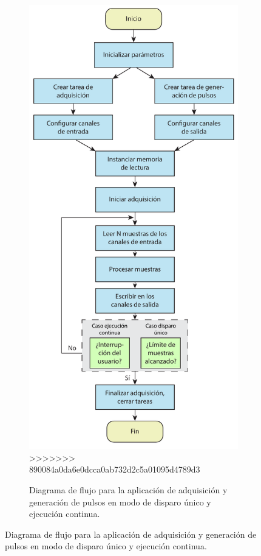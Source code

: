 \documentclass[a4paper,11pt]{article}
\begin{document}
\begin{figure}[!ht]
\begin{figure}[h!]
        \centering
        \includegraphics[height=.95\textheight]{figs/flujo_software.pdf}
>>>>>>> 890084a0da6e0dcca0ab732d2c5a01095d4789d3
        \caption{Diagrama de flujo para la aplicación de adquisición y generación de pulsos en modo de disparo único y ejecución continua.}
        \label{fig:flujo_software}
    \end{figure}


\end{figure}
\end{document}

